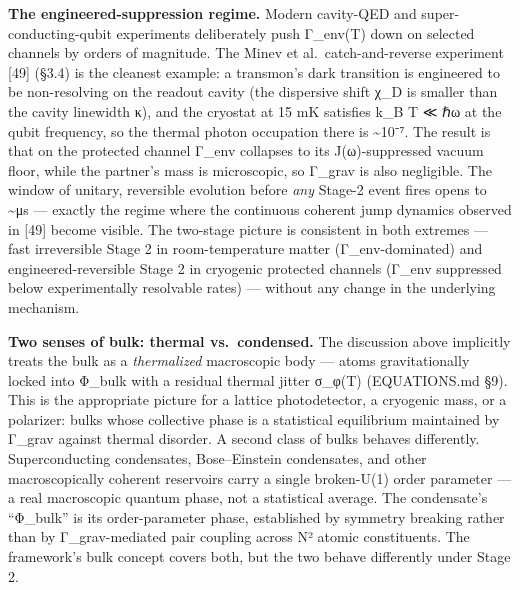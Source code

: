 \documentclass[
]{article}
\begin{document}
\textbf{The engineered-suppression regime.} Modern cavity-QED and super-
conducting-qubit experiments deliberately push Γ\_env(T) down on
selected channels by orders of magnitude. The Minev et
al.~catch-and-reverse experiment {[}49{]} (§3.4) is the cleanest
example: a transmon's dark transition is engineered to be non-resolving
on the readout cavity (the dispersive shift χ\_D is smaller than the
cavity linewidth κ), and the cryostat at 15 mK satisfies k\_B T ≪ ℏω at
the qubit frequency, so the thermal photon occupation there is
\textasciitilde10⁻⁷. The result is that on the protected channel Γ\_env
collapses to its J(ω)-suppressed vacuum floor, while the partner's mass
is microscopic, so Γ\_grav is also negligible. The window of unitary,
reversible evolution before \emph{any} Stage-2 event fires opens to
\textasciitilde μs --- exactly the regime where the continuous coherent
jump dynamics observed in {[}49{]} become visible. The two-stage picture
is consistent in both extremes --- fast irreversible Stage 2 in
room-temperature matter (Γ\_env-dominated) and engineered-reversible
Stage 2 in cryogenic protected channels (Γ\_env suppressed below
experimentally resolvable rates) --- without any change in the
underlying mechanism.

\textbf{Two senses of bulk: thermal vs.~condensed.} The discussion above
implicitly treats the bulk as a \emph{thermalized} macroscopic body ---
atoms gravitationally locked into Φ\_bulk with a residual thermal jitter
σ\_φ(T) (EQUATIONS.md §9). This is the appropriate picture for a lattice
photodetector, a cryogenic mass, or a polarizer: bulks whose collective
phase is a statistical equilibrium maintained by Γ\_grav against thermal
disorder. A second class of bulks behaves differently. Superconducting
condensates, Bose--Einstein condensates, and other macroscopically
coherent reservoirs carry a single broken-U(1) order parameter --- a
real macroscopic quantum phase, not a statistical average. The
condensate's ``Φ\_bulk'' is its order-parameter phase, established by
symmetry breaking rather than by Γ\_grav-mediated pair coupling across
N² atomic constituents. The framework's bulk concept covers both, but
the two behave differently under Stage 2.
\end{document}
